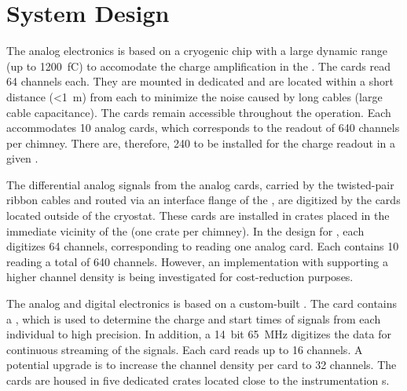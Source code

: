 \section{System Design}
\label{sec:dp-tpcelec-design}

The   analog electronics is based on a cryogenic  chip with a large dynamic range (up to \SI{1200}{\femto\coulomb}) to accomodate the charge amplification in the %
{}. The  cards read \num{64}  channels each. They are mounted in dedicated   and are located within a short distance (\SI{<1}{\metre}) from each  to minimize the noise caused by long cables (large cable capacitance). The cards remain accessible throughout the  operation. Each  %
accommodates \num{10}  analog cards, which corresponds to the readout of \num{640}  channels per chimney. There are, therefore, \num{240}  to be installed for the charge readout in a given .   

The differential analog signals from the analog  cards, carried by the twisted-pair ribbon cables and routed via an interface flange of the , are digitized by the  cards located outside of the cryostat. These cards are installed in  crates placed in the immediate vicinity of the  (one crate per chimney). In the design for , each  digitizes \num{64} channels, corresponding to reading one  analog card. Each   contains \num{10}  reading a total of \num{640} channels. However, an implementation with  supporting a higher channel density is being investigated for cost-reduction purposes. 

The   analog and digital electronics is based on a custom-built . The card contains a   \cite{Blin:2017}, which is used to determine %
the charge and start times of signals from each individual  to high precision. In addition, a \SI{14}{bit} \SI{65}{MHz}  digitizes the data for continuous streaming of the  signals. Each card reads up to \num{16} channels. A potential %
upgrade is to increase the channel density per card to \num{32} channels. The  cards are housed in five dedicated  crates located close to the  instrumentation \fdth{}s.

